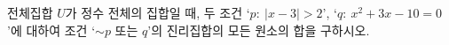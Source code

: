 전체집합 $U$가 정수 전체의 집합일 때, 두 조건 `$p:\ |x-3|>2$', `$q:\ x^2+3x-10=0$'에 대하여 조건 `$\sim p$ 또는 $q$'의 진리집합의 모든 원소의 합을 구하시오.
